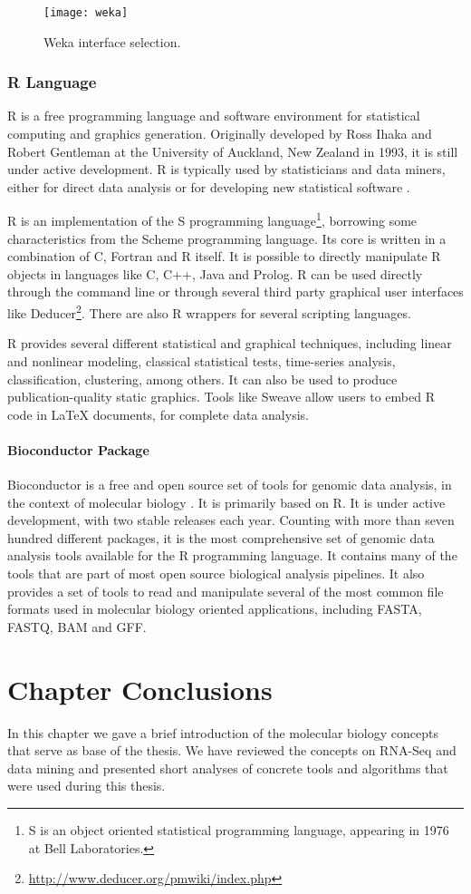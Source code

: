 \begin{figure}[!htb]
  \begin{center}
    \leavevmode
    \texttt{[image: weka]}
    \caption[Weka interface selection]{Weka interface selection.}
    \label{fig:weka}
  \end{center}
\end{figure}

\subsubsection*{R Language}

R \cite{Ihaka1998} is a free programming language and software environment for
statistical computing and graphics generation. Originally developed by Ross
Ihaka and Robert Gentleman at the University of Auckland, New Zealand in 1993,
it is still under active development. R is typically used by statisticians and
data miners, either for direct data analysis or for developing new statistical
software \cite{Fox2005}.

R is an implementation of the S programming language\footnote{S is an object
oriented statistical programming language, appearing in 1976 at Bell
Laboratories.}, borrowing some characteristics from the Scheme programming
language. Its core is written in a combination of C, Fortran and R itself. It is
possible to directly manipulate R objects in languages like C, C++, Java and
Prolog. R can be used directly through the command line or through several third
party graphical user interfaces like
Deducer\footnote{\url{http://www.deducer.org/pmwiki/index.php}}. There are also
R wrappers for several scripting languages.

R provides several different statistical and graphical techniques, including
linear and nonlinear modeling, classical statistical tests, time-series
analysis, classification, clustering, among others. It can also be used to
produce publication-quality static graphics. Tools like Sweave
\cite{lmucs-papers:Leisch:2002} allow users to embed R code in \LaTeX{}
documents, for complete data analysis.

\paragraph{Bioconductor Package}

Bioconductor is a free and open source set of tools for genomic data analysis,
in the context of molecular biology \cite{lmucs-papers:Leisch:2002}. It is
primarily based on R. It is under active development, with two stable releases
each year. Counting with more than seven hundred different packages, it is the
most comprehensive set of genomic data analysis tools available for the R
programming language. It contains many of the tools that are part of most open
source biological analysis pipelines. It also provides a set of tools to read
and manipulate several of the most common file formats used in molecular biology
oriented applications, including FASTA, FASTQ, BAM and GFF.

\section{Chapter Conclusions}

In this chapter we gave a brief introduction of the molecular biology concepts
that serve as base of the thesis. We have reviewed the concepts on RNA-Seq and
data mining and presented short analyses of concrete tools and algorithms that
were used during this thesis.

